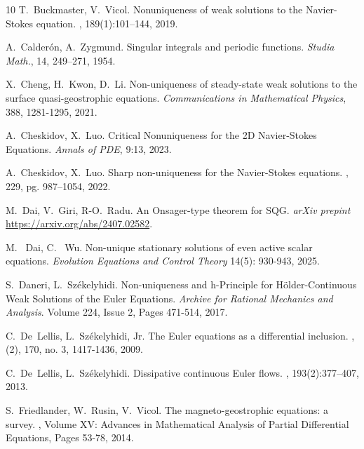 \documentclass[12pt,reqno,letterpaper]{amsart}
\numberwithin{equation}{section}
\newcommand{\1}{{\bf 1}}
\newcommand{\2}{{\bf 2}}
\theoremstyle{remark}
\theoremstyle{remark}
\begin{document}
\begin{thebibliography}{10}
    T.~Buckmaster, V.~Vicol.
    \newblock Nonuniqueness of weak solutions to the {N}avier-{S}tokes equation.
    , 189(1):101--144, 2019.

    A.~Calder\'{o}n, A.~Zygmund.
    \newblock Singular integrals and periodic functions.
    \newblock \emph{Studia Math.}, 14, 249--271, 1954.

    X.~Cheng, H.~Kwon, D.~Li.
    \newblock Non-uniqueness of steady-state weak solutions to the surface quasi-geostrophic equations.
    \newblock\emph{Communications in Mathematical Physics}, 388, 1281-1295, 2021.

     A.~Cheskidov, X.~Luo.
    \newblock Critical Nonuniqueness for the 2D Navier-Stokes Equations.
    \newblock \emph{Annals of PDE}, 9:13, 2023.

    A.~Cheskidov, X.~Luo.
    \newblock Sharp non-uniqueness for the Navier-Stokes equations.
    , 229, pg. 987--1054, 2022.

    M.~Dai, V.~Giri, R-O.~Radu.
    \newblock An Onsager-type theorem for SQG.
    \newblock \emph{arXiv prepint} \url{https://arxiv.org/abs/2407.02582}.

    M. ~Dai, C. ~Wu.
    \newblock Non-unique stationary solutions of even active scalar equations.
    \newblock \emph{Evolution Equations and Control Theory} 14(5): 930-943, 2025.

    S.~Daneri, L.~Sz\'{e}kelyhidi.
    \newblock Non-uniqueness and h-Principle for Hölder-Continuous Weak
    Solutions of the Euler Equations.
    \newblock \emph{Archive for Rational Mechanics and Analysis}. Volume 224,
    Issue 2, Pages 471-514, 2017.

    C.~De~Lellis, L.~Sz\'ekelyhidi, Jr.
    \newblock The Euler equations as a differential inclusion.
    , (2), 170, no. 3, 1417-1436, 2009.
    
    C.~De~Lellis, L.~Sz{{\'e}}kelyhidi.
    \newblock Dissipative continuous {E}uler flows.
    , 193(2):377--407, 2013.

    S.~Friedlander, W.~Rusin, V.~Vicol.
    \newblock The magneto-geostrophic equations: a survey.
    , Volume XV: Advances in Mathematical Analysis of Partial Differential Equations, Pages 53-78, 2014.


\end{thebibliography}
\end{document}
